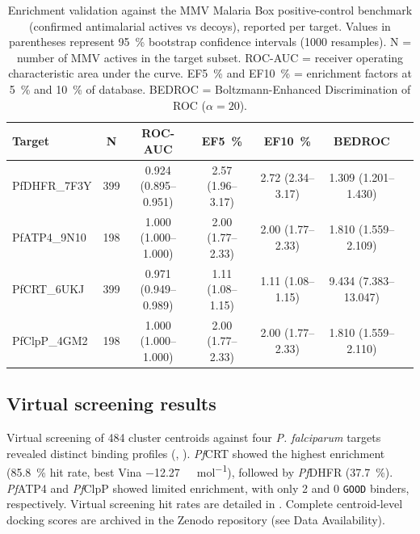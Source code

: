 \documentclass[journal=jcisd8,manuscript=article]{achemso}
\begin{document}
\begin{table}[htbp]
\centering
\caption{Enrichment validation against the MMV Malaria Box positive-control benchmark (confirmed antimalarial actives vs decoys), reported per target. Values in parentheses represent \qty{95}{\percent} bootstrap confidence intervals (\num{1000} resamples). N = number of MMV actives in the target subset. ROC-AUC = receiver operating characteristic area under the curve. EF\qty{5}{\percent} and EF\qty{10}{\percent} = enrichment factors at \qty{5}{\percent} and \qty{10}{\percent} of database. BEDROC = Boltzmann-Enhanced Discrimination of ROC ($\alpha=\num{20}$).}
\label{tab:enrichment_validation}
\small
\begin{tabular}{lcccccc}
\toprule
Target & N & ROC-AUC & EF\qty{5}{\percent} & EF\qty{10}{\percent} & BEDROC \\
\midrule
PfDHFR\_7F3Y & \num{399} & \num{0.924} (\numrange{0.895}{0.951}) & \num{2.57} (\numrange{1.96}{3.17}) & \num{2.72} (\numrange{2.34}{3.17}) & \num{1.309} (\numrange{1.201}{1.430}) \\
PfATP4\_9N10 & \num{198} & \num{1.000} (\numrange{1.000}{1.000}) & \num{2.00} (\numrange{1.77}{2.33}) & \num{2.00} (\numrange{1.77}{2.33}) & \num{1.810} (\numrange{1.559}{2.109}) \\
PfCRT\_6UKJ & \num{399} & \num{0.971} (\numrange{0.949}{0.989}) & \num{1.11} (\numrange{1.08}{1.15}) & \num{1.11} (\numrange{1.08}{1.15}) & \num{9.434} (\numrange{7.383}{13.047}) \\
PfClpP\_4GM2 & \num{198} & \num{1.000} (\numrange{1.000}{1.000}) & \num{2.00} (\numrange{1.77}{2.33}) & \num{2.00} (\numrange{1.77}{2.33}) & \num{1.810} (\numrange{1.559}{2.110}) \\
\bottomrule
\end{tabular}
\end{table}


\subsection{Virtual screening results}
\label{sec:mpo}

Virtual screening of \num{484} cluster centroids against four \textit{P. falciparum} targets revealed distinct binding profiles (, ). \textit{Pf}CRT showed the highest enrichment (\qty{85.8}{\percent} hit rate, best Vina \qty{-12.27}{\kilo\calorie\per\mole}), followed by \textit{Pf}DHFR (\qty{37.7}{\percent}). \textit{Pf}ATP4 and \textit{Pf}ClpP showed limited enrichment, with only \num{2} and \num{0} \texttt{GOOD} binders, respectively. Virtual screening hit rates are detailed in . Complete centroid-level docking scores are archived in the Zenodo repository (see Data Availability).
\end{document}
